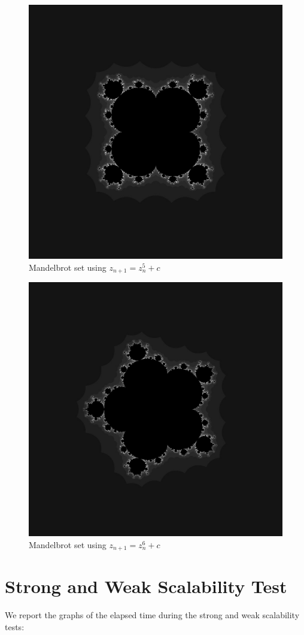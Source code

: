 \documentclass{article}
\begin{document}
\begin{figure}[H] %
	\centering
	\includegraphics[width=0.5\columnwidth]{images/custom_mandelbrot_image_pentapower_peculiar_10} %
	\caption{Mandelbrot set using $z_{n+1} = z^{5}_n + c$}
\end{figure}

\begin{figure}[H] %
	\centering
	\includegraphics[width=0.5\columnwidth]{images/custom_mandelbrot_image_esapower_peculiar_11} %
	\caption{Mandelbrot set using $z_{n+1} = z^{6}_n + c$}
\end{figure}

\section{Strong and Weak Scalability Test}
We report the graphs of the elapsed time during the strong and weak scalability tests:
\end{document}
